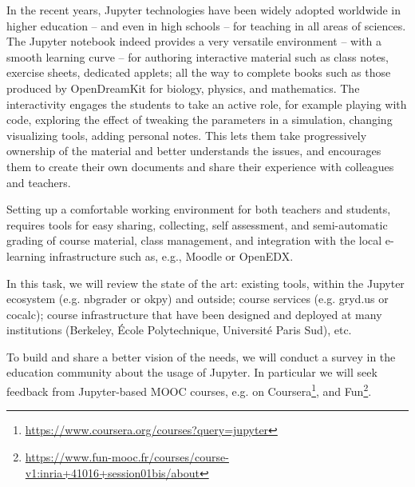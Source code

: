 \begin{task}[
  title={Teaching tools, infrastructure, and best practices},
  id=teaching-tools,
  lead=EP,
  PM=21, %
  wphases={0-36},
  partners={UPSUD}
]



  In the recent years, Jupyter technologies have been widely adopted
  worldwide in higher education -- and even in high schools -- for
  teaching in all areas of sciences. The Jupyter notebook indeed
  provides a very versatile environment -- with a smooth learning
  curve -- for authoring interactive material such as class notes,
  exercise sheets, dedicated applets; all the way to complete books
  such as those produced by OpenDreamKit for biology, physics, and
  mathematics. The interactivity engages the students to take an
  active role, for example playing with code, exploring the effect of
  tweaking the parameters in a simulation, changing visualizing tools,
  adding personal notes. This lets them take progressively ownership
  of the material and better understands the issues, and encourages
  them to create their own documents and share their experience with
  colleagues and teachers.

  Setting up a comfortable working environment for both teachers and
  students, requires tools for easy sharing, collecting, self
  assessment, and semi-automatic grading of course material, class
  management, and integration with the local e-learning infrastructure
  such as, e.g., Moodle or OpenEDX.

  In this task, we will review the state of the art: existing tools,
  within the Jupyter ecosystem (e.g. nbgrader \cite{Hamrick2016} or okpy) and outside;
  course services (e.g. gryd.us or cocalc); course infrastructure that
  have been designed and deployed at many institutions (Berkeley,
  École Polytechnique, Université Paris Sud), etc.

  To build and share a better vision of the needs, we will conduct a
  survey in the education community about the usage of Jupyter. In
  particular we will seek feedback from Jupyter-based MOOC courses,
  e.g. on
  Coursera\footnote{\url{https://www.coursera.org/courses?query=jupyter}},
  and
  Fun\footnote{\url{https://www.fun-mooc.fr/courses/course-v1:inria+41016+session01bis/about}}.


\end{task}
